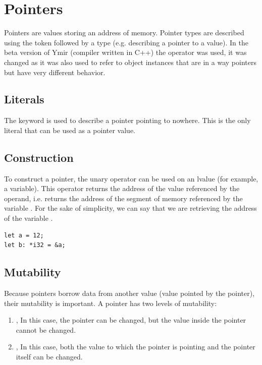 \section{Pointers}%
\label{sec:pointer_type}

Pointers are values storing an address of memory. Pointer types are described
using the \token{*} token followed by a type (e.g.  describing a
pointer to a  value). In the beta version of Ymir (compiler written
in C++) the operator \token{\&} was used, it was changed as it was also used to
refer to object instances that are in a way pointers but have very different
behavior.

\subsection {Literals}

The keyword  is used to describe a pointer pointing to nowhere.
This is the only literal that can be used as a pointer value.

\subsection {Construction}

To construct a pointer, the unary operator \token{\&} can be used on an lvalue
(for example, a variable). This operator returns the address of the value
referenced by the operand, i.e.  returns the address of the segment
of memory referenced by the variable . For the sake of simplicity, we
can say that we are retrieving the address of the variable .

\begin{lstlisting}[style=coloredverbatim]
let a = 12;
let b: *i32 = &a;
\end{lstlisting}

\subsection {Mutability}

Because pointers borrow data from another value (value pointed by the pointer),
their mutability is important. A pointer has two levels of mutability:
\begin{enumerate}
  \setlength\itemsep{-4pt}
\item {}, In this case, the pointer can be changed, but the value
  inside the pointer cannot be changed.
\item {}, In this case, both the value to which the pointer
  is pointing and the pointer itself can be changed.
\end{enumerate}

